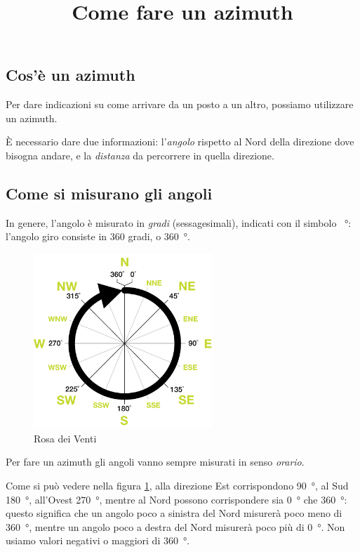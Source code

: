 \documentclass[12pt]{article}
\title{Come fare un azimuth}
\author{}
\begin{document}
\maketitle

\subsection*{Cos'è un azimuth}

Per dare indicazioni su come arrivare da un posto a un altro, possiamo utilizzare un azimuth. 

È necessario dare due informazioni: l'\emph{angolo} rispetto al Nord della direzione dove bisogna andare, e la \emph{distanza} da percorrere in quella direzione. 

\subsection*{Come si misurano gli angoli}

In genere, l'angolo è misurato in \emph{gradi} (sessagesimali), indicati con il simbolo \SI{}{\degree}: l'angolo giro consiste in 360 gradi, o \SI{360}{\degree}. 

\begin{figure}[H]
\centering
\includegraphics[width=0.6\textwidth]{figures/CompassRoseSimple.png}
\caption{Rosa dei Venti}
\label{fig:rosa-venti}
\end{figure}

Per fare un azimuth gli angoli vanno sempre misurati in senso \emph{orario}. 

Come si può vedere nella figura \ref{fig:rosa-venti}, alla direzione Est corrispondono \SI{90}{\degree}, al Sud \SI{180}{\degree}, all'Ovest \SI{270}{\degree}, mentre al Nord possono corrispondere sia \SI{0}{\degree} che \SI{360}{\degree}: questo significa che un angolo poco a sinistra del Nord misurerà poco meno di \SI{360}{\degree}, mentre un angolo poco a destra del Nord misurerà poco più di \SI{0}{\degree}. Non usiamo valori negativi o maggiori di \SI{360}{\degree}. 
\end{document}
